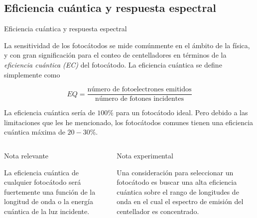\documentclass[a4paper,10pt]{beamer}
\begin{document}
\subsection{Eficiencia cuántica y respuesta espectral}
\begin{frame}[allowframebreaks]{Eficiencia cuántica y respuesta espectral}
 \begin{justify}
  
  \small{La sensitividad de los fotocátodos se mide comúnmente en el ámbito
  de la física, y con gran significación para el conteo de centelladores
  en términos de la \emph{eficiencia cuántica (EC)} del fotocátodo.
  La eficiencia cuántica se define simplemente como}
  
  \begin{equation}
   EQ = \frac{\text{número de fotoelectrones emitidos}}{\text{número de fotones incidentes}}
  \end{equation}

  \vspace{.2cm}
  
  \small{La eficiencia cuántica sería de $100\%$ para un fotocátodo ideal. Pero
  debido a las limitaciones que les he mencionado, los fotocátodos
  comunes tienen una eficiencia cuántica máxima de $20-30\%$.}
  
  \begin{columns}[c]
    \column{2in}
  \begin{block}{Nota relevante}
  \begin{justify}
   La eficiencia cuántica de cualquier fotocátodo será fuertemente una 
   función de la longitud de onda o la energía cuántica de la luz incidente.
   \end{justify}
  \end{block}
    \column{2in}
  \begin{exampleblock}{Nota experimental}
  \begin{justify}
  Una consideración para seleccionar un fotocátodo es buscar una alta
  eficiencia cuántica sobre el rango de longitudes de onda en el 
  cual el espectro de emisión del centellador es concentrado.
   \end{justify}
  \end{exampleblock}
  \end{columns}

  \pause
  

\end{justify}
\end{frame}
\end{document}
